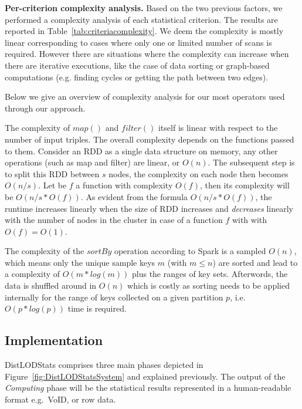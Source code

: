 \noindent
\textbf{Per-criterion complexity analysis.} Based on the two previous factors, we performed a complexity analysis of each statistical criterion. The results are reported in Table~\ref{tab:criteriacomplexity}. 
We deem the complexity is mostly linear corresponding to cases where only one or limited number of scans is required. 
However there are situations where the complexity can increase when there are iterative executions, like the case of data sorting or graph-based computations (e.g. finding cycles or getting the path between two edges).

\noindent
Below we give an overview of complexity analysis for our most operators used through our approach.

The complexity of $map()$ and $filter()$ itself is linear with respect to the number of input triples. %
The overall complexity depends on the functions passed to them. 
Consider an RDD as a single data structure on memory, any other operations (such as map and filter) are linear, or $O(n)$. 
The subsequent step is to split this RDD between $s$ nodes, the complexity on each node then becomes $O(n/s)$.
Let be $f$ a function with complexity $O(f)$, then its complexity will be $O(n/s * O(f))$.
As evident from the formula $O(n/s * O(f))$, the runtime increases linearly when the size of RDD increases and \emph{decreases} linearly with the number of nodes in the cluster in case of a function $f$ with with $O(f)=O(1)$.

The complexity of the $sortBy$ operation according to Spark is a sampled $O(n)$, which means only the unique sample keys $m$ (with $m \le n$) are sorted and lead to a complexity of $O(m*log(m))$ plus the ranges of key sets. 
Afterwords, the data is shuffled around in $O(n)$ which is costly as sorting needs to be applied internally for the range of keys collected on a given partition $p$, i.e.~$O(p*log(p))$ time is required.

\subsection{Implementation}
\label{subsection:implementation}
DistLODStats comprises three main phases depicted in Figure~\ref{fig:DistLODStatsSystem} and explained previously.
The output of the \emph{Computing} phase will be the statistical results represented in a human-readable format e.g.~VoID, or row data.

